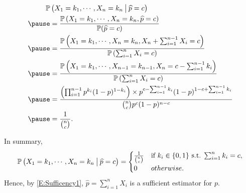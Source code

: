 \begin{frame}
 \begin{align*}
  \PP&\left(X_1=k_1,\cdots,X_n=k_n \:\big| \: \widehat p = c \right)\\\pause
  &= \frac{\PP\left(X_1=k_1,\cdots,X_n=k_n, \widehat p = c \right)}{\PP(\widehat p = c)}\\\pause
  &= \frac{\PP\left(X_1=k_1,\cdots,X_n=k_n, X_n + \sum_{i=1}^{n-1} X_i = c \right)}{\PP\left(\sum_{i=1}^n X_i = c\right)}\\ \pause
  &= \frac{\PP\left(X_1=k_1,\cdots,X_{n-1}=k_{n-1}, X_n = c -\sum_{i=1}^{n-1} k_i  \right)}{\PP\left(\sum_{i=1}^n X_i = c\right)}\\ \pause
  &=
  \frac{\left(\prod_{i=1}^{n-1} p^{k_i}(1-p)^{1-k_i}\right) \times p^{c-\sum_{i=1}^{n-1} k_i} (1-p)^{1-c+\sum_{i=1}^{n-1} k_i}}{{n\choose c}p^c(1-p)^{n-c}}\\ \pause
  &=\frac{1}{{n\choose c}}.
 \end{align*}
 \end{frame}
 \begin{frame}
 In summary,
 \[
 \mathbb{P}\left(X_1=k_1,\cdots,X_n=k_n \:\big| \: \widehat p = c \right)
 =\begin{cases}
   \frac{1}{{n\choose c}} & \text{if $k_i\in\{0,1\}$ s.t. $\sum_{i=1}^n k_i=c$,}\\
   0 & otherwise.
  \end{cases}
 \]
\vfill \pause
Hence, by \eqref{E:Sufficency1}, $\widehat p = \sum_{i=1}^n X_i$ is a sufficient estimator for $p$.
\end{frame}
